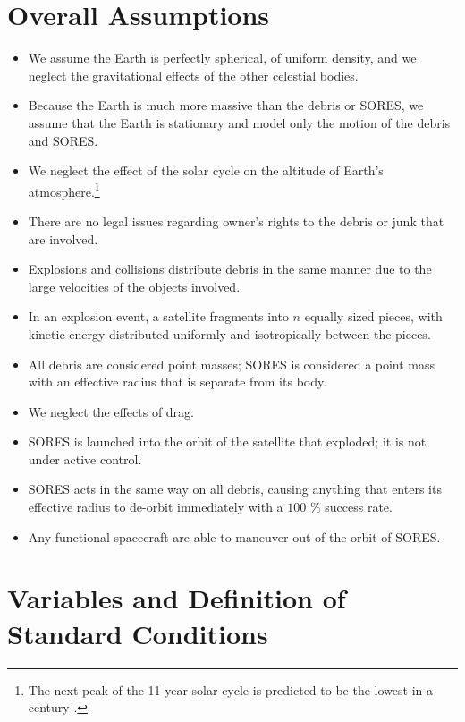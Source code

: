 \documentclass[12pt]{scrartcl}
\begin{document}
\section{Overall Assumptions} \label{sec:assumptions}
\begin{itemize}
\item We assume the Earth is perfectly spherical, of uniform density, and we neglect the gravitational effects of the other celestial bodies.
\item Because the Earth is much more massive than the debris or SORES, we assume that the Earth is stationary and model only the motion of the debris and SORES.
\item We neglect the effect of the solar cycle on the altitude of Earth's atmosphere.\footnote{The next peak of the 11-year solar cycle is predicted to be the lowest in a century \cite{solar cycle}.}
\item There are no legal issues regarding owner's rights to the debris or junk that are involved.
\item Explosions and collisions distribute debris in the same manner due to the large velocities of the objects involved.
\item In an explosion event, a satellite fragments into \(n\) equally sized pieces, with kinetic energy distributed uniformly and isotropically between the pieces.
\item All debris are considered point masses; SORES is considered a point mass with an effective radius that is separate from its body.
\item We neglect the effects of drag.
\item SORES is launched into the orbit of the satellite that exploded; it is not under active control.
\item SORES acts in the same way on all debris, causing anything that enters its effective radius to de-orbit immediately with a \(100\) \(\%\) success rate.
\item Any functional spacecraft are able to maneuver out of the orbit of SORES.
\end{itemize}

\section{Variables and Definition of Standard Conditions} \label{sec:vars_defns}
\end{document}
